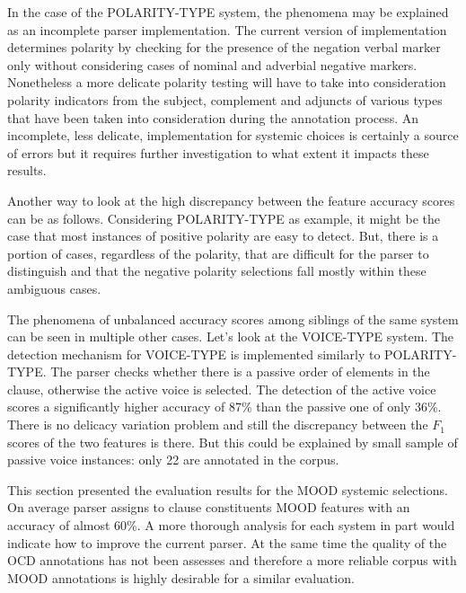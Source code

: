     In the case of the POLARITY-TYPE system, the phenomena may be explained as an incomplete parser implementation. The current version of implementation determines polarity by checking for the presence of the negation verbal marker only without considering cases of nominal and adverbial negative markers. Nonetheless a more delicate polarity testing will have to take into consideration polarity indicators from the subject, complement and adjuncts of various types that have been taken into consideration during the annotation process. An incomplete, less delicate, implementation for systemic choices is certainly a source of errors but it requires further investigation to what extent it impacts these results. %
    
    Another way to look at the high discrepancy between the feature accuracy scores can be as follows. Considering POLARITY-TYPE as example, it might be the case that most instances of positive polarity are easy to detect. But, there is a portion of cases, regardless of the polarity, that are difficult for the parser to distinguish and that the negative polarity selections fall mostly within these ambiguous cases. %
    
    The phenomena of unbalanced accuracy scores among siblings of the same system can be seen in multiple other cases. Let's look at the VOICE-TYPE system. The detection mechanism for VOICE-TYPE is implemented similarly to POLARITY-TYPE. The parser checks whether there is a passive order of elements in the clause, otherwise the active voice is selected.
    The detection of the active voice scores a significantly higher accuracy of 87\% than the passive one of only 36\%. There is no delicacy variation problem and still the discrepancy between the $F_1$ scores of the two features is there. But this could be explained by small sample of passive voice instances: only 22 are annotated in the corpus. 

    This section presented the evaluation results for the MOOD systemic selections. On average parser assigns to clause constituents MOOD features with an accuracy of almost 60\%. A more thorough analysis for each system in part would indicate how to improve the current parser. At the same time the quality of the OCD annotations has not been assesses and therefore a more reliable corpus with MOOD annotations is highly desirable for a similar evaluation. %

